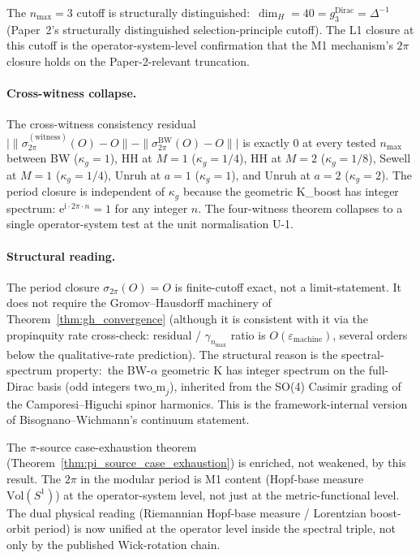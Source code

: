 \documentclass[11pt]{article}
\begin{document}
The $n_{\max} = 3$ cutoff is structurally distinguished:\ $\dim_H = 40
= g_3^{\mathrm{Dirac}} = \Delta^{-1}$ (Paper~2's structurally
distinguished selection-principle cutoff).  The L1 closure at this
cutoff is the operator-system-level confirmation that the M1 mechanism's
$2\pi$ closure holds on the Paper-2-relevant truncation.

\paragraph{Cross-witness collapse.}
The cross-witness consistency residual
$\bigl|\|\sigma_{2\pi}^{(\text{witness})}(O) - O\| -
\|\sigma_{2\pi}^{\mathrm{BW}}(O) - O\|\bigr|$ is exactly $0$ at every
tested $n_{\max}$ between BW ($\kappa_g = 1$), HH at $M = 1$ ($\kappa_g
= 1/4$), HH at $M = 2$ ($\kappa_g = 1/8$), Sewell at $M = 1$
($\kappa_g = 1/4$), Unruh at $a = 1$ ($\kappa_g = 1$), and Unruh at
$a = 2$ ($\kappa_g = 2$).  The period closure is independent of
$\kappa_g$ because the geometric K\_boost has integer spectrum:
$\mathrm{e}^{\mathrm{i}\cdot 2\pi \cdot n} = 1$ for any integer $n$.
The four-witness theorem collapses to a single operator-system test
at the unit normalisation U-1.

\paragraph{Structural reading.}
The period closure $\sigma_{2\pi}(O) = O$ is finite-cutoff exact, not
a limit-statement.  It does not require the Gromov--Hausdorff machinery
of Theorem~\ref{thm:gh_convergence} (although it is consistent with it
via the propinquity rate cross-check: residual / $\gamma_{n_{\max}}$
ratio is $O(\varepsilon_{\mathrm{machine}})$, several orders below the
qualitative-rate prediction).  The structural reason is the
spectral-spectrum property:\ the BW-$\alpha$ geometric K has integer
spectrum on the full-Dirac basis (odd integers $\mathrm{two\_m}_j$),
inherited from the SO(4) Casimir grading of the Camporesi--Higuchi
spinor harmonics.  This is the framework-internal version of
Bisognano--Wichmann's continuum statement.

The $\pi$-source case-exhaustion theorem
(Theorem~\ref{thm:pi_source_case_exhaustion}) is enriched, not
weakened, by this result.  The $2\pi$ in the modular period is M1
content (Hopf-base measure $\mathrm{Vol}(S^1)$) at the operator-system
level, not just at the metric-functional level.  The dual physical
reading (Riemannian Hopf-base measure / Lorentzian boost-orbit period)
is now unified at the operator level inside the spectral triple, not
only by the published Wick-rotation chain.
\end{document}
